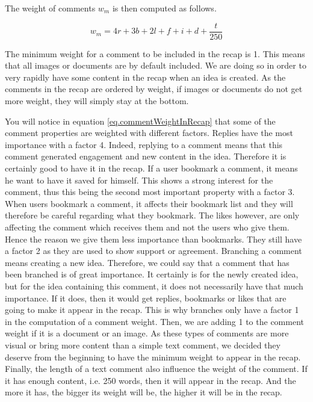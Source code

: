 \documentclass[a4paper,12pt, oneside]{article}
\begin{document}
The weight of comments $w_m$ is then computed as follows.

\begin{equation}
    \label{eq.commentWeightInRecap}
    w_m = 4r + 3b + 2l + f + i + d + \frac{t}{250}
\end{equation}

The minimum weight for a comment to be included in the recap is 1.
This means that all images or documents are by default included.
We are doing so in order to very rapidly have some content in the recap when an idea is created.
As the comments in the recap are ordered by weight, if images or documents do not get more weight, they will simply stay at the bottom.

You will notice in equation \ref{eq.commentWeightInRecap} that some of the comment properties are weighted with different factors.
Replies have the most importance with a factor 4.
Indeed, replying to a comment means that this comment generated engagement and new content in the idea.
Therefore it is certainly good to have it in the recap.
If a user bookmark a comment, it means he want to have it saved for himself.
This shows a strong interest for the comment, thus this being the second most important property with a factor 3.
When users bookmark a comment, it affects their bookmark list and they will therefore be careful regarding what they bookmark.
The likes however, are only affecting the comment which receives them and not the users who give them.
Hence the reason we give them less importance than bookmarks.
They still have a factor 2 as they are used to show support or agreement.
Branching a comment means creating a new idea.
Therefore, we could say that a comment that has been branched is of great importance.
It certainly is for the newly created idea, but for the idea containing this comment, it does not necessarily have that much importance.
If it does, then it would get replies, bookmarks or likes that are going to make it appear in the recap.
This is why branches only have a factor 1 in the computation of a comment weight.
Then, we are adding 1 to the comment weight if it is a document or an image.
As these types of comments are more visual or bring more content than a simple text comment, we decided they deserve from the beginning to have the minimum weight to appear in the recap.
Finally, the length of a text comment also influence the weight of the comment.
If it has enough content, i.e. 250 words, then it will appear in the recap.
And the more it has, the bigger its weight will be, the higher it will be in the recap.
\end{document}
